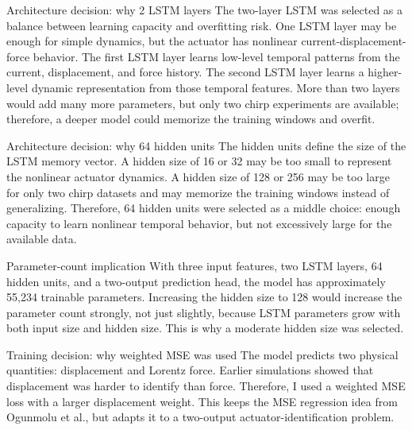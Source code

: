 \documentclass[11pt]{article}
\begin{document}
\begin{architecturedecisionbox}{Architecture decision: why 2 LSTM layers}
The two-layer LSTM was selected as a balance between learning capacity and overfitting risk. One LSTM layer may be enough for simple dynamics, but the actuator has nonlinear current-displacement-force behavior. The first LSTM layer learns low-level temporal patterns from the current, displacement, and force history. The second LSTM layer learns a higher-level dynamic representation from those temporal features. More than two layers would add many more parameters, but only two chirp experiments are available; therefore, a deeper model could memorize the training windows and overfit.
\end{architecturedecisionbox}

\begin{architecturedecisionbox}{Architecture decision: why 64 hidden units}
The hidden units define the size of the LSTM memory vector. A hidden size of 16 or 32 may be too small to represent the nonlinear actuator dynamics. A hidden size of 128 or 256 may be too large for only two chirp datasets and may memorize the training windows instead of generalizing. Therefore, 64 hidden units were selected as a middle choice: enough capacity to learn nonlinear temporal behavior, but not excessively large for the available data.
\end{architecturedecisionbox}

\begin{parameterdecisionbox}{Parameter-count implication}
With three input features, two LSTM layers, 64 hidden units, and a two-output prediction head, the model has approximately 55,234 trainable parameters. Increasing the hidden size to 128 would increase the parameter count strongly, not just slightly, because LSTM parameters grow with both input size and hidden size. This is why a moderate hidden size was selected.
\end{parameterdecisionbox}

\begin{trainingdecisionbox}{Training decision: why weighted MSE was used}
The model predicts two physical quantities: displacement and Lorentz force. Earlier simulations showed that displacement was harder to identify than force. Therefore, I used a weighted MSE loss with a larger displacement weight. This keeps the MSE regression idea from Ogunmolu et al., but adapts it to a two-output actuator-identification problem.
\end{trainingdecisionbox}
\end{document}
